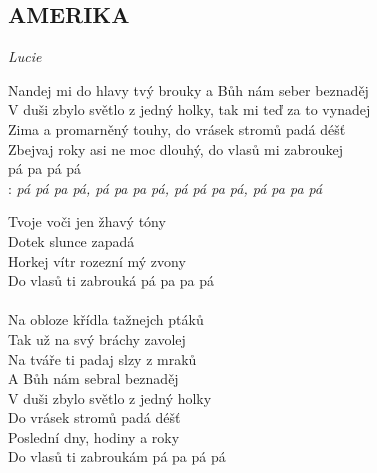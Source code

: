 \begin{flushleft}
	\section*{\Huge AMERIKA}
	\emph{Lucie}
\end{flushleft}

Nandej mi do hlavy tvý brouky a Bůh nám seber beznaděj\\
V duši zbylo světlo z jedný holky, tak mi teď za to vynadej\\
Zima a promarněný touhy, do vrásek stromů padá déšť\\
Zbejvaj roky asi ne moc dlouhý, do vlasů mi zabroukej\\
pá pa pá pá\\

\textregistered:
\emph{
pá pá pa pá, pá pa pa pá, pá pá pa pá, pá pa pa pá\\
}

Tvoje voči jen žhavý tóny\\
Dotek slunce zapadá\\
Horkej vítr rozezní mý zvony\\
Do vlasů ti zabrouká pá pa pa pá\\
\textregistered\\

Na obloze křídla tažnejch ptáků\\
Tak už na svý bráchy zavolej\\
Na tváře ti padaj slzy z mraků\\
A Bůh nám sebral beznaděj\\
V duši zbylo světlo z jedný holky\\
Do vrásek stromů padá déšť\\
Poslední dny, hodiny a roky\\
Do vlasů ti zabroukám pá pa pá pá\\
\textregistered\\

\newpage
